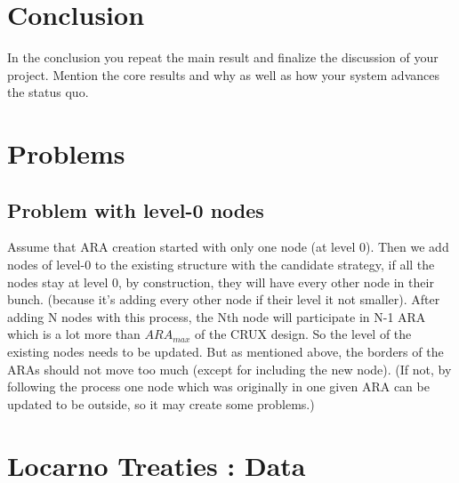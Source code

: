 \documentclass[a4paper,11pt,oneside]{report}
\begin{document}
\chapter{Conclusion} \label{chap:Conclusion}

In the conclusion you repeat the main result and finalize the discussion of
your project. Mention the core results and why as well as how your system
advances the status quo.

\cleardoublepage {} {}
\printbibliography


\appendix

\chapter{Problems}
\section{Problem with level-0 nodes} \label{app:levels-zero}
Assume that ARA creation started with only one node (at level 0). Then we add nodes of level-0 to the existing structure with the candidate strategy, if all the nodes stay at level 0, by construction, they will have every other node in their bunch. (because it’s adding every other node if their level it not smaller). After adding N nodes with this process, the Nth node will participate in N-1 ARA which is a lot more than $ARA_{max}$ of the CRUX \cite{Basescu2014} design. 
So the level of the existing nodes needs to be updated. But as mentioned above, the borders of the ARAs should not move too much (except for including the new node). (If not, by following the process one node which was originally in one given ARA can be updated to be outside, so it may create some problems.)

\chapter{Locarno Treaties : Data} \label{app:LocarnoTreaties-data}
\end{document}
